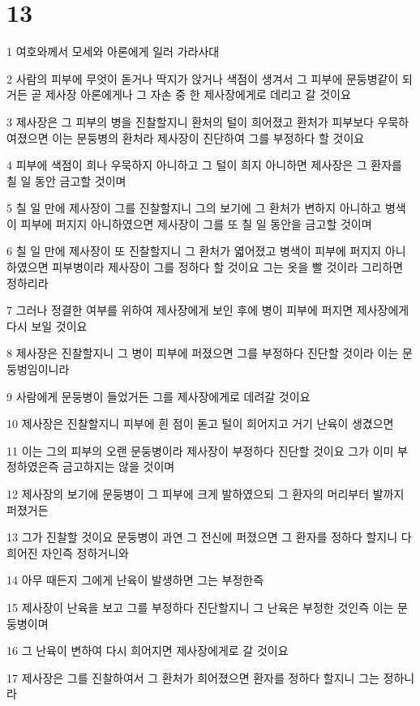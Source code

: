 \chapter{13}

\par 1 여호와께서 모세와 아론에게 일러 가라사대
\par 2 사람의 피부에 무엇이 돋거나 딱지가 앉거나 색점이 생겨서 그 피부에 문둥병같이 되거든 곧 제사장 아론에게나 그 자손 중 한 제사장에게로 데리고 갈 것이요
\par 3 제사장은 그 피부의 병을 진찰할지니 환처의 털이 희어졌고 환처가 피부보다 우묵하여졌으면 이는 문둥병의 환처라 제사장이 진단하여 그를 부정하다 할 것이요
\par 4 피부에 색점이 희나 우묵하지 아니하고 그 털이 희지 아니하면 제사장은 그 환자를 칠 일 동안 금고할 것이며
\par 5 칠 일 만에 제사장이 그를 진찰할지니 그의 보기에 그 환처가 변하지 아니하고 병색이 피부에 퍼지지 아니하였으면 제사장이 그를 또 칠 일 동안을 금고할 것이며
\par 6 칠 일 만에 제사장이 또 진찰할지니 그 환처가 엷어졌고 병색이 피부에 퍼지지 아니하였으면 피부병이라 제사장이 그를 정하다 할 것이요 그는 옷을 빨 것이라 그리하면 정하리라
\par 7 그러나 정결한 여부를 위하여 제사장에게 보인 후에 병이 피부에 퍼지면 제사장에게 다시 보일 것이요
\par 8 제사장은 진찰할지니 그 병이 피부에 퍼졌으면 그를 부정하다 진단할 것이라 이는 문둥벙임이니라
\par 9 사람에게 문둥병이 들었거든 그를 제사장에게로 데려갈 것이요
\par 10 제사장은 진찰할지니 피부에 흰 점이 돋고 털이 희어지고 거기 난육이 생겼으면
\par 11 이는 그의 피부의 오랜 문둥병이라 제사장이 부정하다 진단할 것이요 그가 이미 부정하였은즉 금고하지는 않을 것이며
\par 12 제사장의 보기에 문둥병이 그 피부에 크게 발하였으되 그 환자의 머리부터 발까지 퍼졌거든
\par 13 그가 진찰할 것이요 문둥병이 과연 그 전신에 퍼졌으면 그 환자를 정하다 할지니 다 희어진 자인즉 정하거니와
\par 14 아무 때든지 그에게 난육이 발생하면 그는 부정한즉
\par 15 제사장이 난육을 보고 그를 부정하다 진단할지니 그 난육은 부정한 것인즉 이는 문둥병이며
\par 16 그 난육이 변하여 다시 희어지면 제사장에게로 갈 것이요
\par 17 제사장은 그를 진찰하여서 그 환처가 희어졌으면 환자를 정하다 할지니 그는 정하니라
